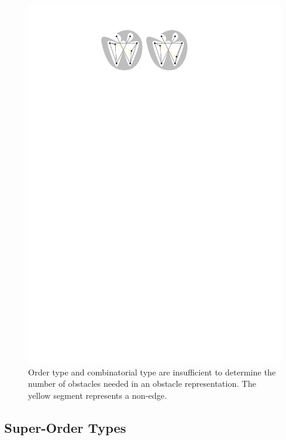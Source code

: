 \documentclass{patmorin}
\begin{document}
\begin{figure}[htbp]
  \begin{center}
    \includegraphics{order-type}
  \end{center}
  \caption{Order type and combinatorial type are insufficient to determine 
      the number of obstacles needed in an obstacle representation. The yellow
      segment represents a non-edge.}
\end{figure}

\subsection{Super-Order Types}
\end{document}
